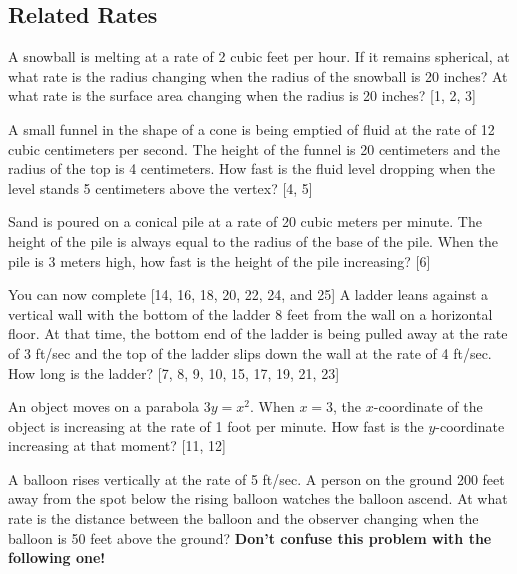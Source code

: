 \subsection*{Related Rates}
\begin{questions}
    \question A snowball is melting at a rate of 2 cubic feet per hour.  If it remains spherical, at what rate is the radius changing when the radius of the snowball is 20 inches?  At what rate is the surface area changing when the radius is 20 inches?  [1, 2, 3]
    
    \question A small funnel in the shape of a cone is being emptied of fluid at the rate of 12 cubic centimeters per second.  The height of the funnel is 20 centimeters and the radius of the top is 4 centimeters.  How fast is the fluid level dropping when the level stands 5 centimeters above the vertex?  [4, 5]
    
    \newpage
    
    \question Sand is poured on a conical pile at a rate of 20 cubic meters per minute.  The height of the pile is always equal to the radius of the base of the pile.  When the pile is 3 meters high, how fast is the height of the pile increasing?  [6]
    
    You can now complete [14, 16, 18, 20, 22, 24, and 25]
    \question A ladder leans against a vertical wall with the bottom of the ladder 8 feet from the wall on a horizontal floor.  At that time, the bottom end of the ladder is being pulled away at the rate of 3 ft/sec and the top of the ladder slips down the wall at the rate of 4 ft/sec.  How long is the ladder?  [7, 8, 9, 10, 15, 17, 19, 21, 23]
    
    \question An object moves on a parabola $3y=x^2$. When $x = 3$, the $x$-coordinate of the object is increasing at the rate of 1 foot per minute.  How fast is the $y$-coordinate increasing at that moment?  [11, 12]
    
    \newpage
    
    \question A balloon rises vertically at the rate of 5 ft/sec.  A person on the ground 200 feet away from the spot below the rising balloon watches the balloon ascend.  At what rate is the distance between the balloon and the observer changing when the balloon is 50 feet above the ground? \textbf{Don’t confuse this problem with the following one!}
    

\end{questions}
